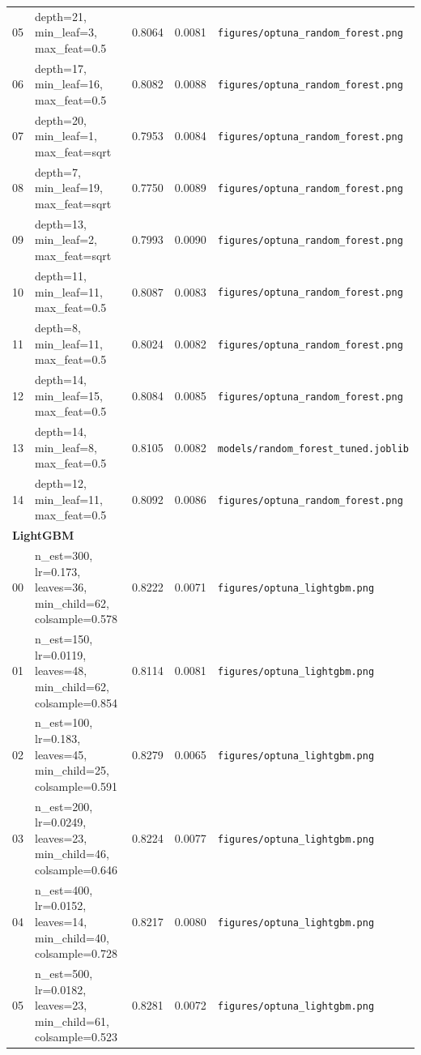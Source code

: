 \documentclass[11pt,a4paper]{article}
\begin{document}
{\begin{longtable}{lp{6.9cm}ccl}
05 & depth=21, min\_leaf=3, max\_feat=0.5 & 0.8064 & 0.0081 & \texttt{figures/optuna\_random\_forest.png}\\
06 & depth=17, min\_leaf=16, max\_feat=0.5 & 0.8082 & 0.0088 & \texttt{figures/optuna\_random\_forest.png}\\
07 & depth=20, min\_leaf=1, max\_feat=sqrt & 0.7953 & 0.0084 & \texttt{figures/optuna\_random\_forest.png}\\
08 & depth=7, min\_leaf=19, max\_feat=sqrt & 0.7750 & 0.0089 & \texttt{figures/optuna\_random\_forest.png}\\
09 & depth=13, min\_leaf=2, max\_feat=sqrt & 0.7993 & 0.0090 & \texttt{figures/optuna\_random\_forest.png}\\
10 & depth=11, min\_leaf=11, max\_feat=0.5 & 0.8087 & 0.0083 & \texttt{figures/optuna\_random\_forest.png}\\
11 & depth=8, min\_leaf=11, max\_feat=0.5 & 0.8024 & 0.0082 & \texttt{figures/optuna\_random\_forest.png}\\
12 & depth=14, min\_leaf=15, max\_feat=0.5 & 0.8084 & 0.0085 & \texttt{figures/optuna\_random\_forest.png}\\
\rowcolor{gray!15} 13 & depth=14, min\_leaf=8, max\_feat=0.5 & 0.8105 & 0.0082 & \texttt{models/random\_forest\_tuned.joblib}\\
14 & depth=12, min\_leaf=11, max\_feat=0.5 & 0.8092 & 0.0086 & \texttt{figures/optuna\_random\_forest.png}\\
\midrule
\multicolumn{5}{l}{\textbf{LightGBM}}\\
00 & n\_est=300, lr=0.173, leaves=36, min\_child=62, colsample=0.578 & 0.8222 & 0.0071 & \texttt{figures/optuna\_lightgbm.png}\\
01 & n\_est=150, lr=0.0119, leaves=48, min\_child=62, colsample=0.854 & 0.8114 & 0.0081 & \texttt{figures/optuna\_lightgbm.png}\\
02 & n\_est=100, lr=0.183, leaves=45, min\_child=25, colsample=0.591 & 0.8279 & 0.0065 & \texttt{figures/optuna\_lightgbm.png}\\
03 & n\_est=200, lr=0.0249, leaves=23, min\_child=46, colsample=0.646 & 0.8224 & 0.0077 & \texttt{figures/optuna\_lightgbm.png}\\
04 & n\_est=400, lr=0.0152, leaves=14, min\_child=40, colsample=0.728 & 0.8217 & 0.0080 & \texttt{figures/optuna\_lightgbm.png}\\
05 & n\_est=500, lr=0.0182, leaves=23, min\_child=61, colsample=0.523 & 0.8281 & 0.0072 & \texttt{figures/optuna\_lightgbm.png}\\

\end{longtable}}
\end{document}
